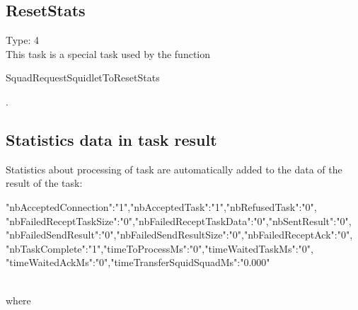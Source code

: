\subsection{ResetStats}

Type: 4\\

This task is a special task used by the function \begin{ttfamily}SquadRequestSquidletToResetStats\end{ttfamily}.

\subsection{Statistics data in task result}

Statistics about processing of task are automatically added to the data of the result of the task:\\
\begin{ttfamily}{"nbAcceptedConnection":"1","nbAcceptedTask":"1","nbRefusedTask":"0",\\
"nbFailedReceptTaskSize":"0","nbFailedReceptTaskData":"0","nbSentResult":"0",\\
"nbFailedSendResult":"0","nbFailedSendResultSize":"0","nbFailedReceptAck":"0",\\
"nbTaskComplete":"1","timeToProcessMs":"0","timeWaitedTaskMs":"0",\\
"timeWaitedAckMs":"0","timeTransferSquidSquadMs":"0.000"}\end{ttfamily}\\
where

